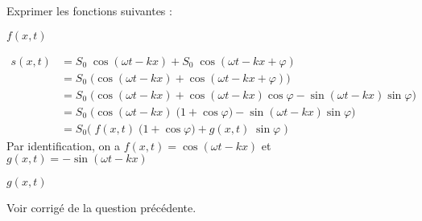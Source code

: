\begin{minipage}{0.32\linewidth}
	\vspace{10pt}
	Exprimer les fonctions suivantes :
\end{minipage}
\hspace*{0cm}
\begin{minipage}{0.67\linewidth}
	\begin{multicols}{2}

	\begin{enonce}
	$f\left(x,t\right)$
	\end{enonce}


	\begin{corrige}
		\begin{align*}
			s\left(x,t\right) & = S_0 \; \cos \left(\omega t - k x\right) + S_0 \; \cos \left(\omega t - k x + \varphi\right) \\
			& = S_0 \; \big( \cos \left(\omega t - k x\right) + \cos \left(\omega t - k x + \varphi\right) \big)\\
			& = S_0 \; \big( \cos \left(\omega t - k x\right) + \cos \left(\omega t - k x\right)\cos \varphi - \sin \left(\omega t - k x\right)\sin \varphi \big)\\
			& = S_0 \; \big( \cos \left(\omega t - k x\right) \; \big(1 +\cos \varphi \big) - \sin \left(\omega t - k x\right)\sin \varphi \big)\\
			& = S_0 \big( \; f\left(x,t\right)\; \big( 1+\cos \varphi \big) + g\left(x,t\right) \; \sin \varphi \; \big)
		\end{align*}
	Par identification, on a $f\left(x,t\right)=\cos \left(\omega t - k x\right)$ et $g\left(x,t\right)=-\sin \left(\omega t - k x\right)$
	\end{corrige}




	\begin{enonce}
	$g\left(x,t\right)$
	\end{enonce}


	\begin{corrige}
	Voir corrigé de la question précédente.
	\end{corrige}

	\end{multicols}

\end{minipage}

